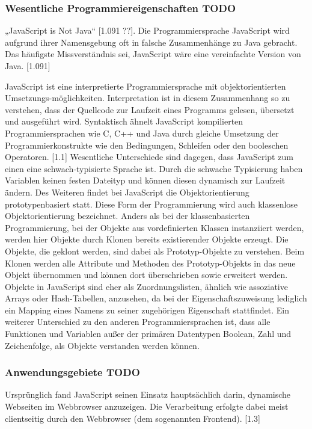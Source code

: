\subsubsection{Wesentliche Programmiereigenschaften TODO}
„JavaScript is Not Java“ [1.091 ??]. Die Programmiersprache JavaScript wird aufgrund ihrer Namensgebung oft in falsche Zusammenhänge zu Java gebracht. Das häufigste Missverständnis sei, JavaScript wäre eine vereinfachte Version von Java. [1.091]
\newline

JavaScript ist eine interpretierte Programmiersprache mit objektorientierten Umsetzungs-möglichkeiten. Interpretation ist in diesem Zusammenhang so zu verstehen, dass der Quellcode zur Laufzeit eines Programms gelesen, übersetzt und ausgeführt wird.
Syntaktisch ähnelt JavaScript kompilierten Programmiersprachen wie C, C++ und Java durch gleiche Umsetzung der Programmierkonstrukte wie den Bedingungen, Schleifen oder den booleschen Operatoren. [1.1] Wesentliche Unterschiede sind dagegen, dass JavaScript zum einen eine schwach-typisierte Sprache ist. Durch die schwache Typisierung haben Variablen keinen festen Dateityp und können diesen dynamisch zur Laufzeit ändern. Des Weiteren findet bei JavaScript die Objektorientierung prototypenbasiert statt. Diese Form der Programmierung wird auch klassenlose Objektorientierung bezeichnet. Anders als bei der klassenbasierten Programmierung, bei der Objekte aus vor\-de\-fi\-niert\-en Klassen instanziiert werden, werden hier Objekte durch Klonen bereits existierender Objekte erzeugt. Die Objekte, die geklont werden, sind dabei als Prototyp-Objekte zu ver\-steh\-en. Beim Klonen werden alle Attribute und Methoden des Prototyp-Objekts in das neue Objekt übernommen und können dort überschrieben sowie erweitert werden. Objekte in JavaScript sind eher als Zuordnungslisten, ähnlich wie assoziative Arrays oder Hash-Tabellen, anzusehen, da bei der Eigenschaftszuweisung lediglich ein Mapping eines Namens zu seiner zugehörigen Eigenschaft stattfindet. Ein weiterer Unterschied zu den anderen Programmiersprachen ist, dass alle Funktionen und Variablen außer der primären Datentypen Boolean, Zahl und Zeichenfolge, als Objekte verstanden werden können.

\subsubsection{Anwendungsgebiete TODO}
Ursprünglich fand JavaScript seinen Einsatz hauptsächlich darin, dynamische Webseiten im Web\-browser anzuzeigen. Die Verarbeitung erfolgte dabei meist clientseitig durch den Webbrowser (dem sogenannten Frontend). [1.3] 
\newline

